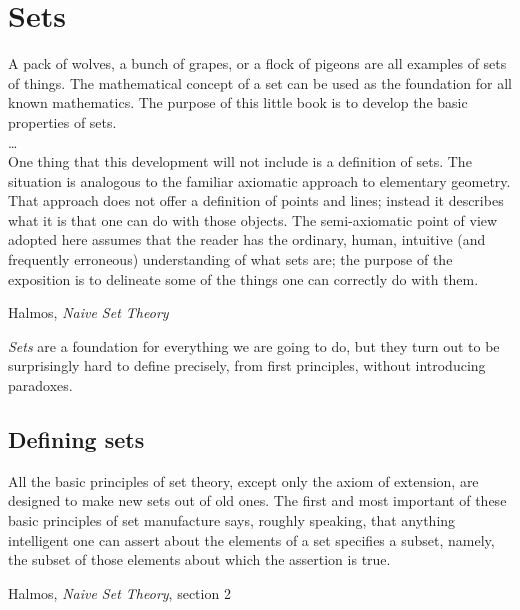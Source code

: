 \section{Sets}
\epigraph{A pack of wolves, a bunch of grapes, or a flock of
pigeons are all examples of sets of things.
The mathematical concept of a set can be used as the foundation
for all known mathematics.
The purpose of this little book is to develop the basic properties
of sets.\\
\ldots \\
One thing that this development will not include is a definition
of sets.
The situation is analogous to the familiar axiomatic approach to
elementary geometry.
That approach does not offer a definition of points and lines;
instead it describes what it is that one can do with those
objects.
The semi-axiomatic point of view adopted here assumes that the
reader has the ordinary, human, intuitive (and frequently
erroneous) understanding of what sets are; the purpose of the
exposition is to delineate some of the things one can correctly do
with them.}%
{Halmos, \textit{Naive Set Theory}\cite{Halmos1960Naive}}

\vfill

\emph{Sets} are a foundation for everything we are going to do,
but they turn out to be surprisingly hard to define precisely,
from first principles, without introducing paradoxes.

\vfill

\label{sec:math-sets}
\lstset{language=Clojure}

\subsection{Defining sets}
\epigraph{All the basic principles of set theory, except only the
axiom of extension, are designed to make new sets out of old ones.
The first and most important of these basic principles of set
manufacture says, roughly speaking, that anything intelligent one
can assert about the elements of a set specifies a subset, namely,
the subset of those elements about which the assertion is true.}
{Halmos,
\textit{Naive Set Theory}, section 2~\cite{Halmos1960Naive}}

